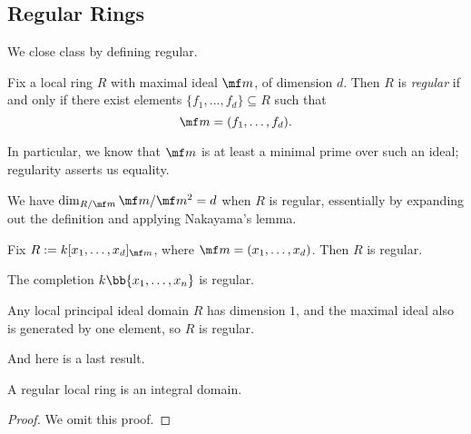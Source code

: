 \subsection{Regular Rings}
We close class by defining regular.
\begin{definition}[Regular]
	Fix a local ring $R$ with maximal ideal $\mf m$, of dimension $d$. Then $R$ is \textit{regular} if and only if there exist elements $\{f_1,\ldots,f_d\}\subseteq R$ such that
	\[\mf m=(f_1,\ldots,f_d).\]
\end{definition}
In particular, we know that $\mf m$ is at least a minimal prime over such an ideal; regularity asserts us equality.
\begin{remark}
	We have $\dim_{R/\mf m}\mf m/\mf m^2=d$ when $R$ is regular, essentially by expanding out the definition and applying Nakayama's lemma.
\end{remark}
\begin{example}
	Fix $R:=k[x_1,\ldots,x_d]_{\mf m}$, where $\mf m=(x_1,\ldots,x_d)$. Then $R$ is regular.
\end{example}
\begin{example}
	The completion $k\bb{x_1,\ldots,x_n}$ is regular.
\end{example}
\begin{example}
	Any local principal ideal domain $R$ has dimension $1$, and the maximal ideal also is generated by one element, so $R$ is regular.
\end{example}
And here is a last result.
\begin{proposition}
	A regular local ring is an integral domain.
\end{proposition}
\begin{proof}
	We omit this proof.
\end{proof}